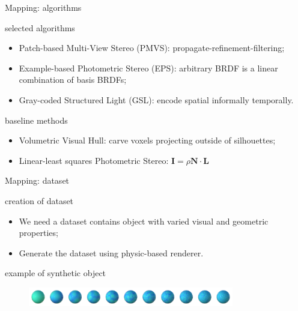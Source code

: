 \documentclass[10pt]{beamer}
\begin{document}
\begin{frame}{Mapping: algorithms}

\begin{exampleblock}{selected algorithms}
\begin{itemize}
\item Patch-based Multi-View Stereo (PMVS): propagate-refinement-filtering;
\item Example-based Photometric Stereo (EPS): arbitrary BRDF is a linear combination of basis BRDFs;
\item Gray-coded Structured Light (GSL): encode spatial informally temporally.
\end{itemize}
\end{exampleblock}

\begin{exampleblock}{baseline methods}
\begin{itemize}
\item Volumetric Visual Hull: carve voxels projecting outside of silhouettes;
\item Linear-least squares Photometric Stereo: $\mathbf{I}=\rho\mathbf{N}\cdot\mathbf{L}$
\end{itemize}
\end{exampleblock}

\end{frame}

\begin{frame}{Mapping: dataset}

\begin{exampleblock}{creation of dataset}
\begin{itemize}
\item We need a dataset contains object with varied visual and geometric properties;
\item Generate the dataset using physic-based renderer.
\end{itemize}
\end{exampleblock}

\begin{exampleblock}{example of synthetic object}
\begin{figure}
\centering
\includegraphics[width=0.8\textwidth]{mapping/setup/tex}
\end{figure}
\end{exampleblock}

\end{frame}
\end{document}
